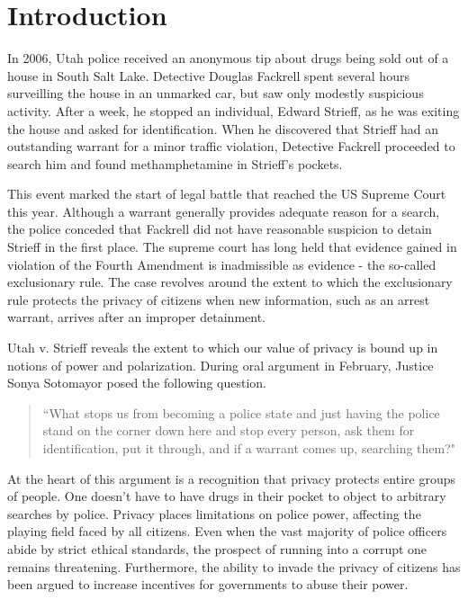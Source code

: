 %

\section{Introduction}
\label{sec:intro}




In 2006, Utah police received an anonymous tip about drugs being sold out of a house in South Salt Lake. Detective Douglas Fackrell spent several hours surveilling the house in an unmarked car, but saw only modestly suspicious activity.  After a week, he stopped an individual, Edward Strieff, as he was exiting the house and asked for identification.  When he discovered that Strieff had an outstanding warrant for a minor traffic violation, Detective Fackrell proceeded to search him and found methamphetamine in Strieff's pockets.  

This event marked the start of legal battle that reached the US Supreme Court this year.  Although a warrant generally provides adequate reason for a search, the police conceded that Fackrell did not have reasonable suspicion to detain Strieff in the first place.  The supreme court has long held that evidence gained in violation of the Fourth Amendment is inadmissible as evidence - the so-called exclusionary rule.  The case revolves around the extent to which the exclusionary rule protects the privacy of citizens when new information, such as an arrest warrant, arrives after an improper detainment.

Utah v. Strieff reveals the extent to which our value of privacy is bound up in notions of power and polarization.  During oral argument in February, Justice Sonya Sotomayor posed the following question. 

\begin{quote}``What stops us from becoming a police state and just having the police stand on the corner down here and stop every person, ask them for identification, put it through, and if a warrant comes up, searching them?"
\end{quote}

At the heart of this argument is a recognition that privacy protects entire groups of people.  One doesn't have to have drugs in their pocket to object to arbitrary searches by police.  Privacy places limitations on police power, affecting the playing field faced by all citizens.  Even when the vast majority of police officers abide by strict ethical standards, the prospect of running into a corrupt one remains threatening.  Furthermore, the ability to invade the privacy of citizens has been argued to increase incentives for governments to abuse their power.  \cite{laskowskigovernment}


